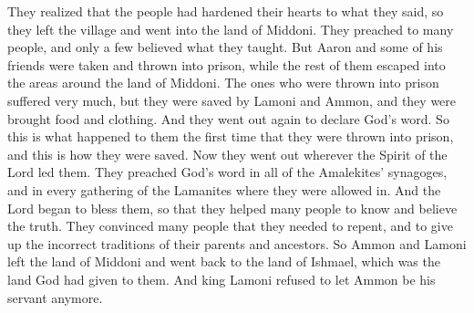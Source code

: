 They realized that the people had hardened their hearts to what they said, so they left the village and went into the land of Middoni. They preached to many people, and only a few believed what they taught.
\bverse \iffalse Nevertheless, Aaron and a certain number of his brethren were taken and cast into prison, and the remainder of them fled out of the land of Middoni unto the regions round about. \fi
But Aaron and some of his friends were taken and thrown into prison, while the rest of them escaped into the areas around the land of Middoni.
\bverse \iffalse And those who were cast into prison suffered many things, and they were delivered by the hand of Lamoni and Ammon, and they were fed and clothed. \fi
The ones who were thrown into prison suffered very much, but they were saved by Lamoni and Ammon, and they were brought food and clothing. 
\bverse \iffalse And they went forth again to declare the word, and thus they were delivered for the first time out of prison; and thus they had suffered. \fi
And they went out again to declare God's word. So this is what happened to them the first time that they were thrown into prison, and this is how they were saved.
\bverse \iffalse And they went forth whithersoever they were led by the Spirit of the Lord, preaching the word of God in every synagogue of the Amalekites, or in every assembly of the Lamanites where they could be admitted. \fi
Now they went out wherever the Spirit of the Lord led them. They preached God's word in all of the Amalekites' synagoges, and in every gathering of the Lamanites where they were allowed in.
\bverse \iffalse And it came to pass that the Lord began to bless them, insomuch that they brought many to the knowledge of the truth; yea, they did convince many of their sins, and of the traditions of their fathers, which were not correct. \fi
And the Lord began to bless them, so that they helped many people to know and believe the truth. They convinced many people that they needed to repent, and to give up the incorrect traditions of their parents and ancestors.
\bverse \iffalse And it came to pass that Ammon and Lamoni returned from the land of Middoni to the land of Ishmael, which was the land of their inheritance. \fi
So Ammon and Lamoni left the land of Middoni and went back to the land of Ishmael, which was the land God had given to them.
\bverse \iffalse And king Lamoni would not suffer that Ammon should serve him, or be his servant. \fi
And king Lamoni refused to let Ammon be his servant anymore.

